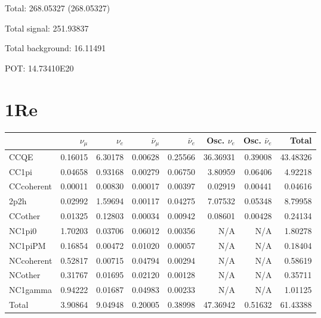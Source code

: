 \documentclass[10pt,a4paper]{article}
\begin{document}
Total: 268.05327    (268.05327)


Total signal: 251.93837


Total background: 16.11491

POT: 14.73410E20


\section*{1Re}
\begin{tabular} { | l ||r | r | r | r | r | r | | r | }
\hline
              & $\nu_\mu$            & $\nu_e$              & $\bar{\nu}_{\mu}$    & $\bar{\nu}_{e}$      & Osc. $\nu_e$         & Osc. $\bar{\nu}_{e}$ & Total                \\ \hline\hline
 CCQE         & 0.16015              & 6.30178              & 0.00628              & 0.25566              & 36.36931             & 0.39008              & 43.48326             \\ \hline
 CC1pi        & 0.04658              & 0.93168              & 0.00279              & 0.06750              & 3.80959              & 0.06406              & 4.92218              \\ \hline
 CCcoherent   & 0.00011              & 0.00830              & 0.00017              & 0.00397              & 0.02919              & 0.00441              & 0.04616              \\ \hline
 2p2h         & 0.02992              & 1.59694              & 0.00117              & 0.04275              & 7.07532              & 0.05348              & 8.79958              \\ \hline
 CCother      & 0.01325              & 0.12803              & 0.00034              & 0.00942              & 0.08601              & 0.00428              & 0.24134              \\ \hline
 NC1pi0       & 1.70203              & 0.03706              & 0.06012              & 0.00356              & N/A                  & N/A                  & 1.80278              \\ \hline
 NC1piPM      & 0.16854              & 0.00472              & 0.01020              & 0.00057              & N/A                  & N/A                  & 0.18404              \\ \hline
 NCcoherent   & 0.52817              & 0.00715              & 0.04794              & 0.00294              & N/A                  & N/A                  & 0.58619              \\ \hline
 NCother      & 0.31767              & 0.01695              & 0.02120              & 0.00128              & N/A                  & N/A                  & 0.35711              \\ \hline
 NC1gamma     & 0.94222              & 0.01687              & 0.04983              & 0.00233              & N/A                  & N/A                  & 1.01125              \\ \hline
\hline
 Total        & 3.90864              & 9.04948              & 0.20005              & 0.38998              & 47.36942             & 0.51632              & 61.43388             \\ \hline

\end{tabular}
\end{document}
